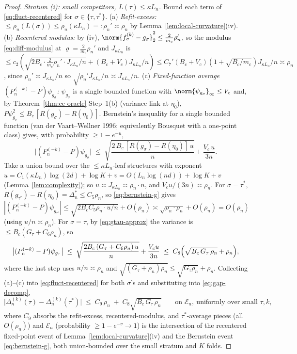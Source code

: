 \begin{proof}
\emph{Stratum (i): small competitors, $L(\tau)\le\kappa L_n$.} Bound each term of
\eqref{eq:fluct-recentered} for $\sigma\in\{\tau,\tau^\ast\}$.
(a) \emph{Refit-excess:} $\le\rho_n(L(\sigma))\le\rho_n(\kappa L_n)=:\rho_n'
\asymp\rho_n$ by Lemma~\ref{lem:local-curvature}(iv).
(b) \emph{Recentered modulus:} by (iv),
$\norm{f_\sigma^{(k)}-g_\sigma}_2^2\le\tfrac{2}{m_c}\rho_n'$, so the modulus
\eqref{eq:diff-modulus} at $\varrho=\tfrac{2}{m_c}\rho_n'$ and $J_{\kappa L_n}$ is
$\le c_2(\sqrt{2B_c\cdot\tfrac{2}{m_c}\rho_n'\cdot J_{\kappa L_n}/n}+(B_c+V_c)
J_{\kappa L_n}/n)\le C_7'(B_c+V_c)(1+\sqrt{B_c/m_c})J_{\kappa L_n}/n\asymp\rho_n$,
since $\rho_n'\asymp J_{\kappa L_n}/n$ so $\sqrt{\rho_n' J_{\kappa L_n}/n}\asymp
J_{\kappa L_n}/n$.
(c) \emph{Fixed-function average $(P_n^{(-k)}-P)\psi_{g_\sigma}$:} $\psi_{g_\sigma}$
is a single bounded function with $\norm{\psi_{g_\sigma}}_\infty\le V_c$ and, by
Theorem~\ref{thm:ce-oracle} Step~1(b) (variance link at $\eta_0$),
$P\psi_{g_\sigma}^2\le B_c\,[R(g_\sigma)-R(\eta_0)]$. Bernstein's inequality for a
single bounded function (van der Vaart--Wellner 1996; equivalently Bousquet with
a one-point class) gives, with probability $\ge1-e^{-u}$,
\begin{equation}\label{eq:bernstein-g}
  \bigl|(P_n^{(-k)}-P)\psi_{g_\sigma}\bigr|
  \;\le\; \sqrt{\frac{2\,B_c\,[R(g_\sigma)-R(\eta_0)]\,u}{n}}
        + \frac{V_c\,u}{3n}.
\end{equation}
Take a union bound over the $\le\kappa L_n$-leaf structures with exponent
$u=C_1(\kappa L_n)\log(2d)+\log K+v=O(L_n\log(nd))+\log K+v$
(Lemma~\ref{lem:complexity}); so $u\asymp J_{\kappa L_n}\asymp\rho_n\cdot n$, and
$V_c u/(3n)\asymp\rho_n$. For $\sigma=\tau^\ast$, $R(g_{\tau^\ast})-R(\eta_0)=
\Delta^\ast_n\le C_5\rho_n$, so \eqref{eq:bernstein-g} gives
$|(P_n^{(-k)}-P)\psi_{g_{\tau^\ast}}|\le\sqrt{2B_c C_5\rho_n\cdot u/n}+
O(\rho_n)\asymp\sqrt{\rho_n\cdot\rho_n}+O(\rho_n)=O(\rho_n)$ (using $u/n\asymp
\rho_n$). For $\sigma=\tau$, by \eqref{eq:gtau-approx} the variance is
$\le B_c(G_\tau+C_6\rho_n)$, so
\begin{equation}\label{eq:g-tau-bound}
  \bigl|(P_n^{(-k)}-P)\psi_{g_\tau}\bigr|
  \;\le\; \sqrt{\frac{2B_c\,(G_\tau+C_6\rho_n)\,u}{n}} + \frac{V_c u}{3n}
  \;\le\; C_8\Bigl(\sqrt{B_c\,G_\tau\,\rho_n} + \rho_n\Bigr),
\end{equation}
where the last step uses $u/n\asymp\rho_n$ and $\sqrt{(G_\tau+\rho_n)\rho_n}
\le\sqrt{G_\tau\rho_n}+\rho_n$. Collecting (a)--(c) into
\eqref{eq:fluct-recentered} for both $\sigma$'s and substituting into
\eqref{eq:gap-decomp},
\begin{equation}\label{eq:small-dev}
  \bigl|\Delta_n^{(k)}(\tau)-\Delta_n^{(k)}(\tau^\ast)\bigr|
  \;\le\; C_9\,\rho_n \;+\; C_8\sqrt{B_c\,G_\tau\,\rho_n}
  \qquad\text{on }\mathcal{E}_n,\ \text{uniformly over small }\tau,k,
\end{equation}
where $C_9$ absorbs the refit-excess, recentered-modulus, and $\tau^\ast$-average
pieces (all $O(\rho_n)$) and $\mathcal{E}_n$ (probability $\ge1-e^{-v}\to1$) is
the intersection of the recentered fixed-point event of
Lemma~\ref{lem:local-curvature}(iv) and the Bernstein event
\eqref{eq:bernstein-g}, both union-bounded over the small stratum and $K$ folds.


\end{proof}
